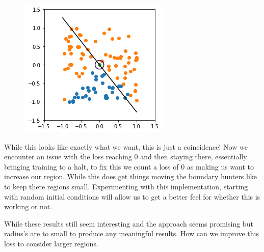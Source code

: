 \documentclass{article}
\begin{document}
\begin{figure}[H]
\centering
  \begin{minipage}[b]{0.4\textwidth}
    \includegraphics[width=\textwidth]{BoundaryHunter-Attempt4-02.png}
    \caption{}
  \end{minipage}
  \hfill
\end{figure}
While this looks like exactly what we want, this is just a coincidence! Now we encounter an issue with the loss reaching 0 and then staying there, essentially bringing training to a halt, to fix this we count a loss of 0 as making us want to increase our region. While this does get things moving the boundary hunters like to keep there regions small. Experimenting with this implementation, starting with random initial conditions will allow us to get a better feel for whether this is working or not.

\begin{figure}[H]
\centering
  \hfill
\end{figure}

While these results still seem interesting and the approach seems promising but radius's are to small to produce any meaningful results. How can we improve this loss to consider larger regions.
\end{document}
